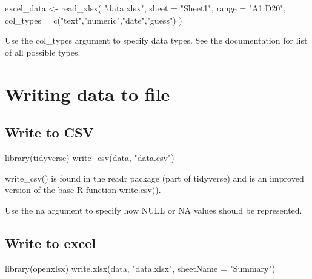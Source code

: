 \documentclass[
]{book}
\newenvironment{Shaded}{\begin{snugshade}}{\end{snugshade}}
\newcommand{\AttributeTok}[1]{\textcolor[rgb]{0.77,0.63,0.00}{#1}}
\newcommand{\FunctionTok}[1]{\textcolor[rgb]{0.00,0.00,0.00}{#1}}
\newcommand{\NormalTok}[1]{#1}
\newcommand{\OtherTok}[1]{\textcolor[rgb]{0.56,0.35,0.01}{#1}}
\newcommand{\StringTok}[1]{\textcolor[rgb]{0.31,0.60,0.02}{#1}}
\begin{document}
\begin{Shaded}
\begin{Highlighting}[]
\NormalTok{excel\_data }\OtherTok{\textless{}{-}} \FunctionTok{read\_xlsx}\NormalTok{(}
  \StringTok{"data.xlsx"}\NormalTok{,}
  \AttributeTok{sheet =} \StringTok{"Sheet1"}\NormalTok{,}
  \AttributeTok{range =} \StringTok{"A1:D20"}\NormalTok{,}
  \AttributeTok{col\_types =} \FunctionTok{c}\NormalTok{(}\StringTok{"text"}\NormalTok{,}\StringTok{"numeric"}\NormalTok{,}\StringTok{"date"}\NormalTok{,}\StringTok{"guess"}\NormalTok{)}
\NormalTok{)}
\end{Highlighting}
\end{Shaded}

Use the col\_types argument to specify data types. See the documentation for list of all possible types.

\hypertarget{writing-data-to-file}{%
\chapter{Writing data to file}\label{writing-data-to-file}}

\hypertarget{write-to-csv}{%
\section{Write to CSV}\label{write-to-csv}}

\begin{Shaded}
\begin{Highlighting}[]
\FunctionTok{library}\NormalTok{(tidyverse)}
\FunctionTok{write\_csv}\NormalTok{(data, }\StringTok{"data.csv"}\NormalTok{)}
\end{Highlighting}
\end{Shaded}

write\_csv() is found in the readr package (part of tidyverse) and is an improved version of the base R function write.csv().

Use the na argument to specify how NULL or NA values should be represented.

\hypertarget{write-to-excel}{%
\section{Write to excel}\label{write-to-excel}}

\begin{Shaded}
\begin{Highlighting}[]
\FunctionTok{library}\NormalTok{(openxlsx)}
\FunctionTok{write.xlsx}\NormalTok{(data, }\StringTok{"data.xlsx"}\NormalTok{, }\AttributeTok{sheetName =} \StringTok{"Summary"}\NormalTok{)}
\end{Highlighting}
\end{Shaded}
\end{document}
